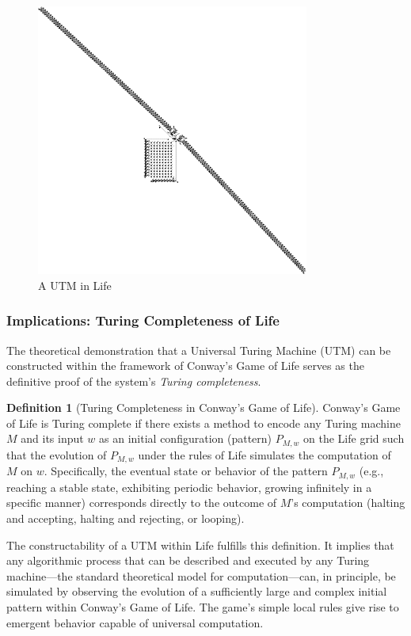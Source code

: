 \documentclass{article}
\theoremstyle{definition}
\newtheorem{definition}{Definition}[section]
\theoremstyle{plain}
\theoremstyle{plain}
\begin{document}
\begin{figure}[H]
  \centering
  \includegraphics[width=0.8\textwidth]{figures/UTM.png} %
   \caption{A UTM in Life \cite{Goucher_2011_UTM}}
  \label{fig:utm-in-life}
\end{figure}

\subsubsection{Implications: Turing Completeness of Life}
The theoretical demonstration that a Universal Turing Machine (UTM) can be constructed within the framework of Conway's Game of Life serves as the definitive proof of the system's \textit{Turing completeness}.

\begin{definition}[Turing Completeness in Conway's Game of Life]
Conway's Game of Life is Turing complete if there exists a method to encode any Turing machine $M$ and its input $w$ as an initial configuration (pattern) $P_{M,w}$ on the Life grid such that the evolution of $P_{M,w}$ under the rules of Life simulates the computation of $M$ on $w$. Specifically, the eventual state or behavior of the pattern $P_{M,w}$ (e.g., reaching a stable state, exhibiting periodic behavior, growing infinitely in a specific manner) corresponds directly to the outcome of $M$'s computation (halting and accepting, halting and rejecting, or looping).
\end{definition}

The constructability of a UTM within Life fulfills this definition. It implies that any algorithmic process that can be described and executed by any Turing machine—the standard theoretical model for computation—can, in principle, be simulated by observing the evolution of a sufficiently large and complex initial pattern within Conway's Game of Life. The game's simple local rules give rise to emergent behavior capable of universal computation.
\end{document}
